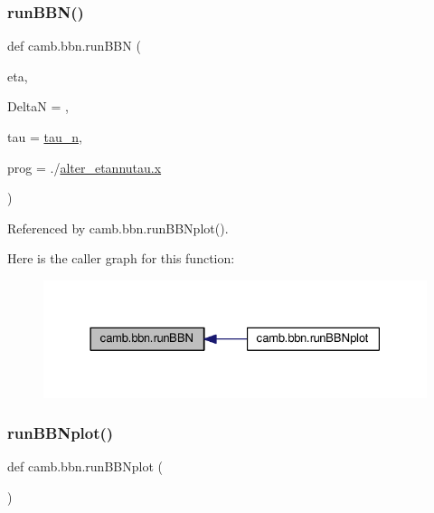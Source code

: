\subsubsection{\texorpdfstring{run\+B\+B\+N()}{runBBN()}}
{\footnotesize\ttfamily def camb.\+bbn.\+run\+B\+BN (\begin{DoxyParamCaption}\item[{}]{eta,  }\item[{}]{DeltaN = {},  }\item[{}]{tau = {\ttfamily \mbox{\hyperlink{namespacecamb_1_1bbn_ae95abe1177100ca3b8cfb59cf9e379be}{tau\+\_\+n}}},  }\item[{}]{prog = {\ttfamily \textquotesingle{}./\mbox{\hyperlink{plotTT_8m_a9336ebf25087d91c818ee6e9ec29f8c1}{alter\+\_\+etannutau.\+x}}\textquotesingle{}} }\end{DoxyParamCaption})}



Referenced by camb.\+bbn.\+run\+B\+B\+Nplot().

Here is the caller graph for this function\+:
\nopagebreak
\begin{figure}[H]
\begin{center}
\leavevmode
\includegraphics[width=328pt]{namespacecamb_1_1bbn_ae39e69c7217dc7635429e776f01fde55_icgraph}
\end{center}
\end{figure}
\mbox{\label{namespacecamb_1_1bbn_ab478fa803bc42b27cc92d291785174c5}} 
\subsubsection{\texorpdfstring{run\+B\+B\+Nplot()}{runBBNplot()}}
{\footnotesize\ttfamily def camb.\+bbn.\+run\+B\+B\+Nplot (\begin{DoxyParamCaption}{ }\end{DoxyParamCaption})}



